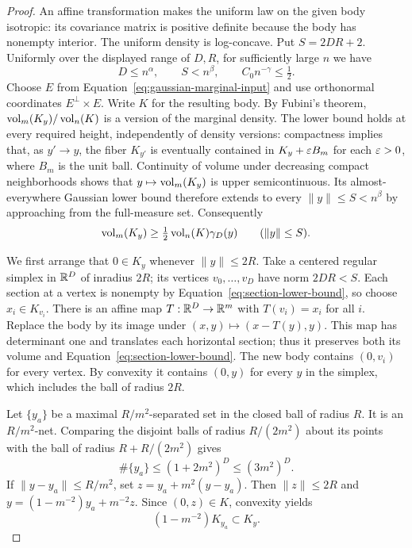 \begin{proof}
An affine transformation makes the uniform law on the given body
isotropic: its covariance matrix is positive definite because the body
has nonempty interior.  The uniform density is log-concave.  Put
$S=2DR+2$.  Uniformly over the displayed range of $D,R$, for sufficiently
large $n$ we have
\[
 D\le n^\alpha,\qquad S<n^\beta,
 \qquad C_0n^{-\gamma}\le\tfrac12.
\]
Choose $E$ from Equation~\eqref{eq:gaussian-marginal-input} and use
orthonormal coordinates $E^\perp\times E$.  Write $K$ for the resulting
body.  By Fubini's theorem, $\operatorname{vol}_m(K_y)/\operatorname{vol}_n(K)$ is a version of
the marginal density.  The lower bound holds at every required height,
independently of density versions: compactness implies that, as $y'\to y$,
the fiber $K_{y'}$ is eventually contained in $K_y+\varepsilon B_m$ for each
$\varepsilon>0$, where $B_m$ is the unit ball.  Continuity of volume under
decreasing compact neighborhoods shows that $y\mapsto\operatorname{vol}_m(K_y)$ is
upper semicontinuous.  Its almost-everywhere Gaussian lower bound therefore
extends to every $\|y\|\le S<n^\beta$ by approaching from the full-measure
set.  Consequently
\begin{equation}
 \operatorname{vol}_m(K_y)\ge\tfrac12\operatorname{vol}_n(K)\gamma_D(y)
 \qquad (\|y\|\le S).
 \label{eq:section-lower-bound}
\end{equation}

We first arrange that $0\in K_y$ whenever $\|y\|\le2R$.
Take a centered regular simplex in $\mathbb R^D$ of inradius $2R$; its vertices
$v_0,\ldots,v_D$ have norm $2DR<S$.  Each section at a vertex is nonempty
by Equation~\eqref{eq:section-lower-bound}, so choose $x_i\in K_{v_i}$.
There is an affine map $T:\mathbb R^D\to\mathbb R^m$ with $T(v_i)=x_i$ for all $i$.
Replace the body by its image under $(x,y)\mapsto(x-T(y),y)$.
This map has determinant one and translates each horizontal section;
thus it preserves both its volume and Equation~\eqref{eq:section-lower-bound}.
The new body contains $(0,v_i)$ for every vertex.  By convexity it contains
$(0,y)$ for every $y$ in the simplex, which includes the ball of radius
$2R$.

Let $\{y_a\}$ be a maximal $R/m^2$-separated set in the closed ball of
radius $R$.  It is an $R/m^2$-net.  Comparing the disjoint balls of radius
$R/(2m^2)$ about its points with the ball of radius $R+R/(2m^2)$ gives
\begin{equation}
 \#\{y_a\}\le(1+2m^2)^D\le(3m^2)^D.
 \label{eq:section-net-size}
\end{equation}
If $\|y-y_a\|\le R/m^2$, set $z=y_a+m^2(y-y_a)$.  Then
$\|z\|\le2R$ and
$y=(1-m^{-2})y_a+m^{-2}z$.  Since $(0,z)\in K$, convexity yields
\begin{equation}
 (1-m^{-2})K_{y_a}\subset K_y.
 \label{eq:section-net-inclusion}
\end{equation}


\end{proof}
